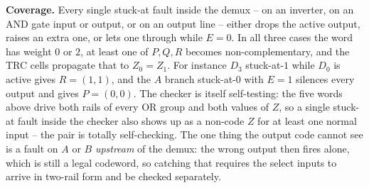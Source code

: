 \documentclass[a4paper, 10pt]{article}
\begin{document}
\begin{solution}
	\myspace
	\textbf{Coverage.} Every single stuck-at fault inside the demux -- on an
	inverter, on an AND gate input or output, or on an output line -- either
	drops the active output, raises an extra one, or lets one through while
	$E=0$. In all three cases the word has weight $0$ or $2$, at least one of
	$P,Q,R$ becomes non-complementary, and the TRC cells propagate that to
	$Z_0 = Z_1$. For instance $D_3$ stuck-at-$1$ while $D_0$ is active gives
	$R = (1,1)$, and the $A$ branch stuck-at-$0$ with $E=1$ silences every
	output and gives $P = (0,0)$. The checker is itself self-testing: the
	five words above drive both rails of every OR group and both values of
	$Z$, so a single stuck-at fault inside the checker also shows up as a
	non-code $Z$ for at least one normal input -- the pair is totally
	self-checking. The one thing the output code cannot see is a fault on $A$
	or $B$ \emph{upstream} of the demux: the wrong output then fires alone,
	which is still a legal codeword, so catching that requires the select
	inputs to arrive in two-rail form and be checked separately.
\end{solution}
\end{document}
